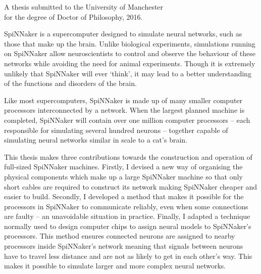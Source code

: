 {
	
	
	
	\vfill
	
	\begin{center}
		\textsc{\large\thesistitle}
		
		\vspace{0.5em}
		
		\thesisauthor
		
		\vspace{0.5em}
		
		A thesis submitted to the University of Manchester\\
		for the degree of Doctor of Philosophy, 2016.
	\end{center}
	
	\vfill
	
	
	SpiNNaker is a supercomputer designed to simulate neural networks, such as
	those that make up the brain. Unlike biological experiments, simulations
	running on SpiNNaker allow neuroscientists to control and observe the
	behaviour of these networks while avoiding the need for animal experiments.
	Though it is extremely unlikely that SpiNNaker will ever `think', it may lead
	to a better understanding of the functions and disorders of the brain.
	
	Like most supercomputers, SpiNNaker is made up of many smaller computer
	processors interconnected by a network. When the largest planned machine is
	completed, SpiNNaker will contain over one million computer processors --
	each responsible for simulating several hundred neurons -- together capable
	of simulating neural networks similar in scale to a cat's brain.
	
	This thesis makes three contributions towards the construction and operation
	of full-sized SpiNNaker machines. Firstly, I devised a new way of organising
	the physical components which make up a large SpiNNaker machine so that only
	short cables are required to construct its network making SpiNNaker cheaper
	and easier to build. Secondly, I developed a method that makes it possible
	for the processors in SpiNNaker to communicate reliably, even when some
	connections are faulty -- an unavoidable situation in practice.  Finally, I
	adapted a technique normally used to design computer chips to assign neural
	models to SpiNNaker's processors. This method ensures connected neurons are
	assigned to nearby processors inside SpiNNaker's network meaning that signals
	between neurons have to travel less distance and are not as likely to get in
	each other's way. This makes it possible to simulate larger and more complex
	neural networks.
	
	\par%
}
